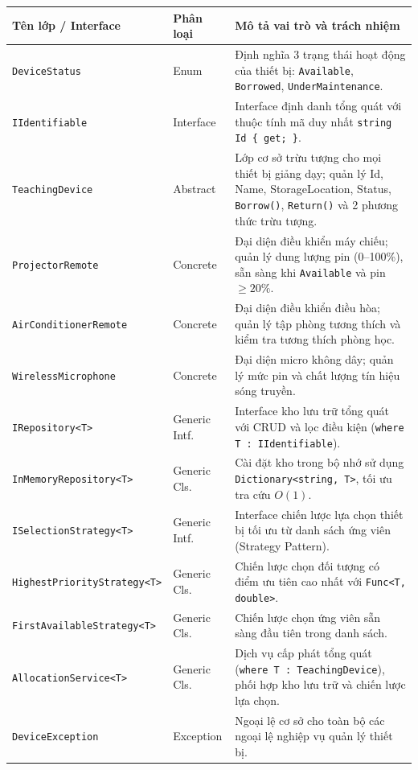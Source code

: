 \documentclass[11pt,a4paper]{article}
\begin{document}
\vspace{-0.1cm}
\begin{table}[H]
\centering
\footnotesize
\renewcommand{\arraystretch}{1.0}
\begin{tabular}{p{4.2cm}p{1.6cm}p{9.4cm}}
\toprule
\textbf{Tên lớp / Interface} & \textbf{Phân loại} & \textbf{Mô tả vai trò và trách nhiệm} \\
\midrule
\texttt{DeviceStatus} & Enum & Định nghĩa 3 trạng thái hoạt động của thiết bị: \texttt{Available}, \texttt{Borrowed}, \texttt{UnderMaintenance}. \\
\texttt{IIdentifiable} & Interface & Interface định danh tổng quát với thuộc tính mã duy nhất \texttt{string Id \{ get; \}}. \\
\texttt{TeachingDevice} & Abstract & Lớp cơ sở trừu tượng cho mọi thiết bị giảng dạy; quản lý Id, Name, StorageLocation, Status, \texttt{Borrow()}, \texttt{Return()} và 2 phương thức trừu tượng. \\
\texttt{ProjectorRemote} & Concrete & Đại diện điều khiển máy chiếu; quản lý dung lượng pin (0--100\%), sẵn sàng khi \texttt{Available} và pin $\ge 20\%$. \\
\texttt{AirConditionerRemote} & Concrete & Đại diện điều khiển điều hòa; quản lý tập phòng tương thích và kiểm tra tương thích phòng học. \\
\texttt{WirelessMicrophone} & Concrete & Đại diện micro không dây; quản lý mức pin và chất lượng tín hiệu sóng truyền. \\
\texttt{IRepository<T>} & Generic Intf. & Interface kho lưu trữ tổng quát với CRUD và lọc điều kiện (\texttt{where T : IIdentifiable}). \\
\texttt{InMemoryRepository<T>} & Generic Cls. & Cài đặt kho trong bộ nhớ sử dụng \texttt{Dictionary<string, T>}, tối ưu tra cứu $O(1)$. \\
\texttt{ISelectionStrategy<T>} & Generic Intf. & Interface chiến lược lựa chọn thiết bị tối ưu từ danh sách ứng viên (Strategy Pattern). \\
\texttt{HighestPriorityStrategy<T>} & Generic Cls. & Chiến lược chọn đối tượng có điểm ưu tiên cao nhất với \texttt{Func<T, double>}. \\
\texttt{FirstAvailableStrategy<T>} & Generic Cls. & Chiến lược chọn ứng viên sẵn sàng đầu tiên trong danh sách. \\
\texttt{AllocationService<T>} & Generic Cls. & Dịch vụ cấp phát tổng quát (\texttt{where T : TeachingDevice}), phối hợp kho lưu trữ và chiến lược lựa chọn. \\
\texttt{DeviceException} & Exception & Ngoại lệ cơ sở cho toàn bộ các ngoại lệ nghiệp vụ quản lý thiết bị. \\
\bottomrule
\end{tabular}
\end{table}
\vspace{-0.2cm}
\end{document}
